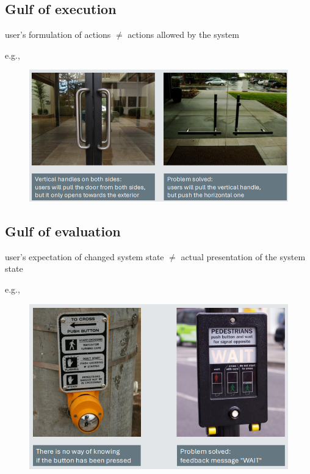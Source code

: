 \documentclass[]{project_plan}
\begin{document}
\subsection{Gulf of execution}
user’s formulation of actions $\neq$ actions allowed by the system

e.g.,
\begin{figure}[h!]
  \centering
  \includegraphics[width=\linewidth]{gulf_execution_example.png}
\end{figure}

\newpage

\subsection{Gulf of evaluation}
user’s expectation of changed system state $\neq$ actual presentation of the system state

e.g.,
\begin{figure}[h!]
  \centering
  \includegraphics[width=\linewidth]{gulf_evaluation_example.png}
\end{figure}
\end{document}
